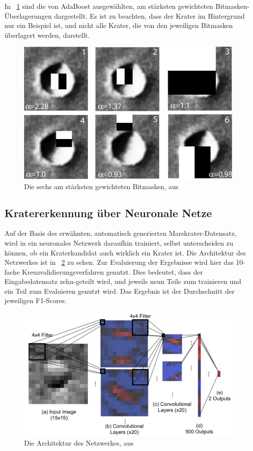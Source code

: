 In \figurename~\ref{fig:BDS12_02} sind die von AdaBoost ausgewählten, am stärksten gewichteten Bitmasken-Überlagerungen dargestellt. Es ist zu beachten, dass der Krater im Hintergrund nur ein Beispiel ist, und nicht alle Krater, die von den jeweiligen Bitmasken überlagert werden, darstellt.

\begin{figure}[H]
	\centering
	\includegraphics[width=.5\textwidth,keepaspectratio]{images/BDS12_02.png}
	\caption{Die sechs am stärksten gewichteten Bitmasken, aus \cite{bandeira_12}}
	\label{fig:BDS12_02}
\end{figure}

\subsection{Kratererkennung über Neuronale Netze}
\label{ssec:crater_cnn}
Auf der Basis des erwähnten, automatisch generierten Marskrater-Datensatz, wird in \cite{cohen_16} ein neuronales Netzwerk daraufhin trainiert, selbst unterscheiden zu können, ob ein Kraterkandidat auch wirklich ein Krater ist. Die Architektur des Netzwerkes ist in \figurename~\ref{fig:CLLD16_01} zu sehen. Zur Evaluierung der Ergebnisse wird hier das 10-fache Kreuzvalidierungsverfahren genutzt. Dies bedeutet, dass der Eingabedatensatz zehn-geteilt wird, und jeweils neun Teile zum trainieren und ein Teil zum Evaluieren genutzt wird. Das Ergebnis ist der Durchschnitt der jeweiligen F1-Scores.

\begin{figure}[H]
	\centering
	\includegraphics[width=.5\textwidth,keepaspectratio]{images/CLLD16_01.png}
	\caption{Die Architektur des Netzwerkes, aus \cite{cohen_16}}
	\label{fig:CLLD16_01}
\end{figure}


